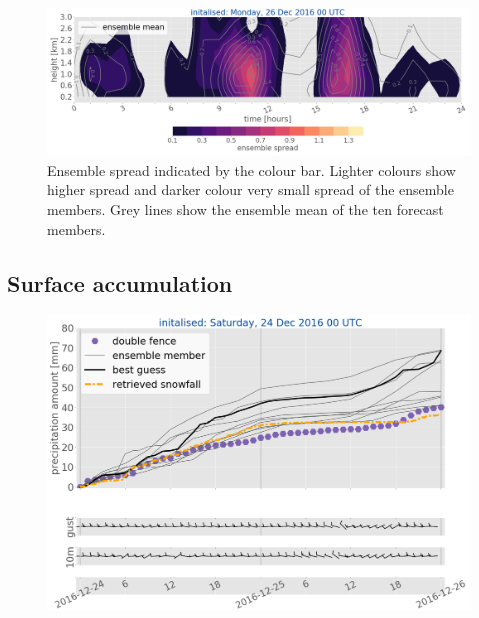 \begin{figure}[h]
	\includegraphics[width=\textwidth]{./fig_ensemble_spread/20161226}
	\caption{Ensemble spread indicated by the colour bar. Lighter colours show higher spread and darker colour very small spread of the ensemble members. Grey lines show the ensemble mean of the ten forecast members.}\label{fig:spread26}
\end{figure}
%
\subsection{Surface accumulation}
\begin{figure}[h]
	\includegraphics[width=\textwidth]{./fig_sfc_acc/acc_wind_20161224_00}
	\caption{}\label{fig:sfc_acc26}
\end{figure}


